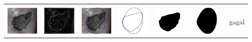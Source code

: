 \begin{table}[H]
\begin{tabular}{|m{0.7in}|m{0.7in}|m{0.7in}|m{0.7in}|m{0.7in}|m{0.7in}|m{0.7in}|}
		&  &  & & & &  \\
		\includegraphics[width=0.7in]{dataset/dataset_3/luka_merah/ready/20_interp_init.jpg}&
		\includegraphics[width=0.7in]{dataset/dataset_3/luka_merah/ready/20_interp_ext.jpg}&
		\includegraphics[width=0.7in]{dataset/dataset_3/luka_merah/ready/20_interp_result.jpg}&
		\includegraphics[width=0.7in]{dataset/dataset_3/luka_merah/ready/20_gt_r.jpg}&
		\includegraphics[width=0.7in]{dataset/dataset_3/luka_merah/ready/20_r.jpg}&
		\includegraphics[width=0.7in]{dataset/dataset_3/luka_merah/ready/20_interp_r.jpg}&
		gagal\\
		\hline
		

\end{tabular}
\end{table}
